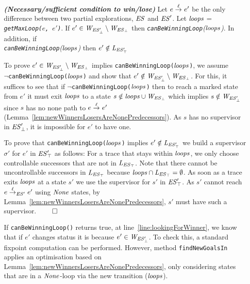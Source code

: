 \begin{lemma}\textbf{\emph{(Necessary/sufficient condition to win/lose)}}
\label{lem:canBeWinningLoopWorks}
Let $e \overset{\ell}{\rightarrow}_{} e'$ be the only difference between two partial explorations, 
$\mathit{ES}$ and $\mathit{ES}'$. Let $\mathit{loops}$ = \emph{\texttt{getMaxLoop($e$, 
$e'$)}}.
If $e' \in \mathit{W_{\mathit{\mathit{ES}'_{\bot}}}} \setminus \mathit{W_{\mathit{\mathit{ES}_{\bot}}}}$ 
then \emph{\texttt{canBeWinningLoop}($\mathit{loops}$)}. In addition, if \\ 
\emph{\texttt{canBeWinningLoop}($\mathit{loops}$)} then $e' \notin \mathit{L_{\mathit{\mathit{ES}'_{\top}}}}$ 
\end{lemma}

\begin{Proof Sketch}
To prove $e' \in \mathit{W_{\mathit{\mathit{ES}'_{\bot}}}} \setminus \mathit{W_{\mathit{\mathit{ES}_{\bot}}}}$ implies  \texttt{canBeWinningLoop($\mathit{loops}$)}, we  
assume \\ $\neg$\texttt{canBeWinningLoop($\mathit{loops}$)} and show that $e' \notin \mathit{W_{\mathit{\mathit{ES}'_{\bot}}}} 
\setminus \mathit{W_{\mathit{\mathit{ES}_{\bot}}}}$. For this, it suffices to see that if 
$\neg$\texttt{canBeWinningLoop($\mathit{loops}$)} then to reach a marked state from $e'$ it must 
exit $\mathit{loops}$ to a state $s \notin \mathit{loops} \cup \mathit{W_{\mathit{\mathit{ES}_{\bot}}}}$ which implies  $s \notin \mathit{W_{\mathit{\mathit{ES}'_{\bot}}}}$ 
since $s$ has no none path to $e 
\overset{\ell}{\rightarrow}_{} e'$  (Lemma~\ref{lem:newWinnersLosersAreNonePredecessors}).
As $s$ has no supervisor in $\mathit{\mathit{ES}'_{\bot}}$, it is impossible 
for 
$e'$ to have one. 


To prove that \texttt{canBeWinningLoop($\mathit{loops}$)} implies $e' \notin \mathit{L_{\mathit{\mathit{ES}'_{\top}}}}$ we build a supervisor $\sigma'$ for $e'$ in $\mathit{\mathit{ES}'_{\top}}$ as 
follows: 
For a trace that stays within $\mathit{loops}$, we only choose controllable successors 
that are not 
in $\mathit{L_{\mathit{\mathit{ES}_{\top}}}}$. Note that there cannot be uncontrollable successors in $\mathit{L_{\mathit{\mathit{ES}_{\top}}}}$ because 
$\mathit{loops} \cap \mathit{L_{\mathit{\mathit{ES}_{\top}}}}= \emptyset$.   As soon as a trace exits $\mathit{loops}$ at a state $s'$ we 
use the supervisor for $s'$ in $\mathit{\mathit{ES}'_{\top}}$. 
As $s'$ cannot reach $e \overset{\ell}{\rightarrow}_{\mathit{ES}'} 
e'$ using $\mathit{None}$ states, by 
Lemma~\ref{lem:newWinnersLosersAreNonePredecessors}, $s'$ must have such a 
supervisor. \hfill$\qed$

\end{Proof Sketch}

If \texttt{canBeWinningLoop()} returns true, at line~\ref{line:lookingForWinner}, 
we know that if $e'$ changes status it is because $e' \in \mathit{W_{\mathit{\mathit{ES}'_{\bot}}}}$.  To check this, a standard 
fixpoint computation can be 
performed. 
However, method 
\texttt{findNewGoalsIn} applies an optimisation based on  
Lemma~\ref{lem:newWinnersLosersAreNonePredecessors}, only 
considering states that are in a $\mathit{None}$-loop via the new 
transition ($\mathit{loops}$).



